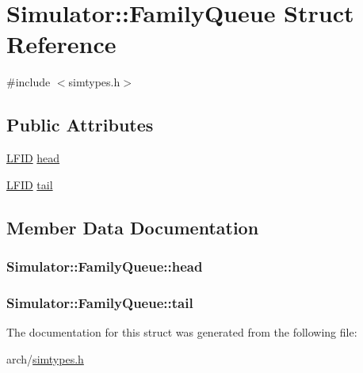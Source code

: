 \hypertarget{struct_simulator_1_1_family_queue}{\section{Simulator\+:\+:Family\+Queue Struct Reference}
\label{struct_simulator_1_1_family_queue}
}


{\ttfamily \#include $<$simtypes.\+h$>$}

\subsection*{Public Attributes}
\begin{DoxyCompactItemize}
\item 
\hyperlink{namespace_simulator_aaccbc706b2d6c99085f52f6dfc2333e4}{L\+F\+I\+D} \hyperlink{struct_simulator_1_1_family_queue_a598835c6a679c16d94d82eac5e395a4b}{head}
\item 
\hyperlink{namespace_simulator_aaccbc706b2d6c99085f52f6dfc2333e4}{L\+F\+I\+D} \hyperlink{struct_simulator_1_1_family_queue_aff7732fbb4ee05cd94d3916f223db10d}{tail}
\end{DoxyCompactItemize}


\subsection{Member Data Documentation}
\hypertarget{struct_simulator_1_1_family_queue_a598835c6a679c16d94d82eac5e395a4b}{
\subsubsection[{head}]{ Simulator\+::\+Family\+Queue\+::head}}\label{struct_simulator_1_1_family_queue_a598835c6a679c16d94d82eac5e395a4b}
\hypertarget{struct_simulator_1_1_family_queue_aff7732fbb4ee05cd94d3916f223db10d}{
\subsubsection[{tail}]{ Simulator\+::\+Family\+Queue\+::tail}}\label{struct_simulator_1_1_family_queue_aff7732fbb4ee05cd94d3916f223db10d}


The documentation for this struct was generated from the following file\+:\begin{DoxyCompactItemize}
\item 
arch/\hyperlink{simtypes_8h}{simtypes.\+h}\end{DoxyCompactItemize}
